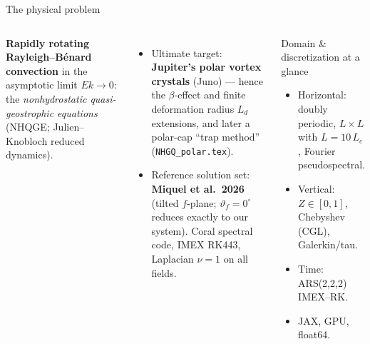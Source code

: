 \documentclass[aspectratio=169,10pt]{beamer}
\newcommand{\Ld}{L_d}
\newcommand{\file}[1]{\textcolor{blue!60!black}{\texttt{#1}}}
\begin{document}
\begin{frame}{The physical problem}
  \begin{columns}[T]
    \textbf{Rapidly rotating Rayleigh--B\'enard convection} in the asymptotic
    limit $Ek\to 0$: the \emph{nonhydrostatic quasi-geostrophic equations}
    (NHQGE; Julien--Knobloch reduced dynamics).
    \begin{itemize}
      \item Ultimate target: \textbf{Jupiter's polar vortex crystals} (Juno) ---
        hence the $\beta$-effect and finite deformation radius $\Ld$ extensions,
        and later a polar-cap ``trap method'' (\file{NHGQ\_polar.tex}).
      \item Reference solution set: \textbf{Miquel et al.\ 2026}
        (tilted $f$-plane; $\vartheta_f=0^\circ$ reduces exactly to our system).
        Coral spectral code, IMEX RK443, Laplacian $\nu=1$ on all fields.
    \end{itemize}
    \begin{block}{Domain \& discretization at a glance}
      \begin{itemize}\itemsep2pt
        \item Horizontal: doubly periodic, $L\times L$ with $L=10\,L_c$,
          Fourier pseudospectral.
        \item Vertical: $Z\in[0,1]$, Chebyshev (CGL), Galerkin/tau.
        \item Time: ARS(2,2,2) IMEX--RK.
        \item JAX, GPU, float64.
      \end{itemize}
    \end{block}
  \end{columns}
\end{frame}
\end{document}
